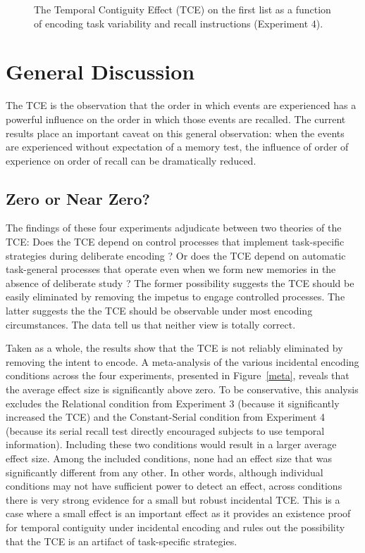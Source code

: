 \documentclass[man,natbib,floatsintext]{apa6} %
\begin{document}
\begin{figure}%
\caption{The Temporal Contiguity Effect (TCE) on the first list as a function of encoding task variability and recall instructions (Experiment 4).\paneltext}
\label{e4_l1_crp}
\end{figure}

\color{black}





\section{General Discussion}
\color{red}
The TCE is the observation that the order in which events are experienced has a powerful influence on the order in which those events are recalled. The current results place an important caveat on this general observation: when the events are experienced without expectation of a memory test, the influence of order of experience on order of recall can be dramatically reduced.  

\label{zerovsnear}
\subsection{Zero or Near Zero?}
The findings of these four experiments adjudicate between two theories of the TCE: Does the TCE depend on control processes that implement task-specific strategies during deliberate encoding \citep{Hint16}? Or does the TCE depend on automatic task-general processes that operate even when we form new memories in the absence of deliberate study \citep{HealKaha17}? The former possibility suggests the TCE should be easily eliminated by removing the impetus to engage controlled processes. The latter suggests the the TCE should be observable under most encoding circumstances. The data tell us that neither view is totally correct.

Taken as a whole, the results show that the TCE is not reliably eliminated by removing the intent to encode. A meta-analysis of the various incidental encoding conditions across the four experiments, presented in Figure~\ref{meta}, reveals that the average effect size is significantly above zero. To be conservative, this analysis excludes the Relational condition from Experiment 3 (because it significantly increased the TCE) and the Constant-Serial condition from Experiment 4 (because its serial recall test directly encouraged subjects to use temporal information). Including these two conditions would result in a larger average effect size. Among the included conditions, none had an effect size that was significantly different from any other. In other words, although individual conditions may not have sufficient power to detect an effect, across conditions there is very strong evidence for a small but robust incidental TCE. This is a case where a small effect is an important effect as it provides an existence proof for temporal contiguity under incidental encoding and rules out the possibility that the TCE is an artifact of task-specific strategies.
\end{document}
